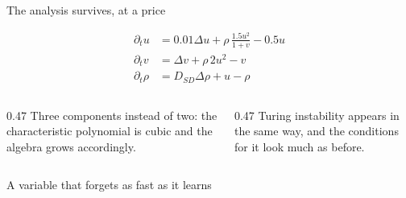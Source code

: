 \begin{frame}{The analysis survives, at a price}

  \vspace{-0.24cm}

  {\color{HydraWhite}\fontsize{9.7}{12.3}\selectfont
  \begin{align*}
    \partial_tu
    &=
    0.01\Delta u
    +
    \rho\,\frac{1.5u^2}{1+v}
    -
    0.5u
    \\
    \partial_tv
    &=
    \Delta v
    +
    \rho\,2u^2
    -
    v
    \\
    \partial_t\rho
    &=
    D_{SD}\Delta\rho
    +
    u
    -
    \rho
  \end{align*}
  }

  \vspace{0.20cm}

  \begin{columns}[T,onlytextwidth]

    \begin{column}{0.47\textwidth}
        {Three components instead of two: the characteristic polynomial is
         cubic and the algebra grows accordingly.}
    \end{column}

    \begin{column}{0.47\textwidth}
        {Turing instability appears in the same way, and the conditions for it
         look much as before.}
    \end{column}

  \end{columns}

\end{frame}


\begin{frame}{A variable that forgets as fast as it learns}

  \vspace{-0.06cm}


  \vspace{0.16cm}


\end{frame}


